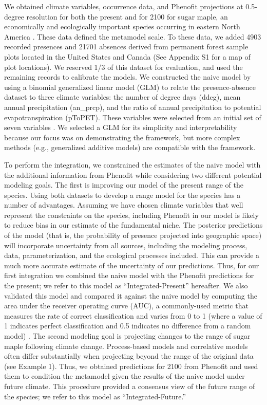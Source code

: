 \documentclass[11pt]{article}
\newcommand{\rev}[1]{{\color{RoyalBlue}#1}}
\begin{document}
We obtained climate variables, occurrence data, and Phenofit projections at 0.5-degree resolution for both the present and for \rev{2100} for sugar maple, an economically and ecologically important species occurring in eastern North America \citep{Morin2009}.
These data defined the metamodel scale.
To these data, we added 4903 recorded presences and 21701 absences derived from permanent forest sample plots located in the United States and Canada (See Appendix S1 for a map of plot locations).
We reserved 1/3 of this dataset for evaluation, and used the remaining records to calibrate the models.
We constructed the naive model by using a binomial generalized linear model (GLM) to relate the presence-absence dataset to three climate variables: the number of degree days (ddeg), mean annual precipitation (an\_prcp), and the ratio of annual precipitation to potential evapotranspiration (pToPET).
These variables were selected from an initial set of \rev{seven} variables \citep[see Appendix S1 and ][for details on the climate variables]{Morin2009}.
We selected a GLM for its simplicity and interpretability because our focus was on demonstrating the framework, but more complex methods (e.g., generalized additive models) are compatible with the framework.

To perform the integration, we constrained the estimates of the naive model with the additional information from Phenofit while considering two different potential modeling goals.
The first is improving our model of the present range of the species.
Using both datasets to develop a range model for the species has a number of advantages.
Assuming we have chosen climate variables that well represent the constraints on the species, including Phenofit in our model is likely to reduce bias in our estimate of the fundamental niche.
The posterior predictions of the model (that is, the probability of presence projected into geographic space) will incorporate uncertainty from all sources, including the modeling process, data, parameterization, and the ecological processes included.
This can provide a much more accurate estimate of the uncertainty of our predictions.
Thus, for our first integration we combined the naive model with the Phenofit predictions for the present; we refer to this model as ``Integrated-Present'' hereafter.
We also validated this model and compared it against the naive model by computing the area under the receiver operating curve (AUC), a commonly-used metric that measures the rate of correct classification and varies from 0 to 1 (where a value of 1 indicates perfect classification and 0.5 indicates no difference from a random model) \citep{Swets1988}.
The second modeling goal is projecting changes to the range of sugar maple following climate change.
Process-based models and correlative models often differ substantially when projecting beyond the range of the original data (see Example 1).
Thus, we obtained predictions for 2100 from Phenofit \citep{Morin2009} and used them to condition the metamodel given the results of the naive model under future climate.
This procedure provided a consensus view of the future range of the species; we refer to this model as ``Integrated-Future.''
\end{document}
